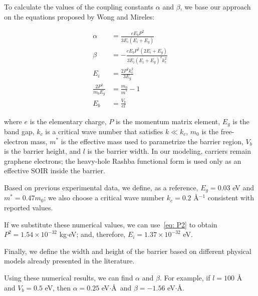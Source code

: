 To calculate the values of the coupling constants $\alpha$ and $\beta$, we base our approach on the equations proposed by Wong and Mireles\cite{WongUNAM2005}:

\begin{align}
    \alpha &= \frac{eE_b P^2}{3E_i\left( E_i + E_g \right)}\label{eq: alfa}\\
    \beta &= -\frac{eE_b P^2\left( 2E_i + E_g \right)}{3E_i\left( E_i + E_g \right)^2 k_c^2}\label{eq: beta}\\
    E_i &= \frac{2P^2 k_c^2}{3E_g} \label{eq: E_i}\\
    \frac{2P^2}{m_0 E_g} &= \frac{m_0}{m^*} - 1 \label{eq: P2}\\
    E_b &= \frac{V_b}{el} \label{eq: E_b}
\end{align}

\noindent where $e$ is the elementary charge, $P$ is the momentum matrix element, $E_g$ is the band gap, $k_c$ is a critical wave number that satisfies $k \ll k_c$, $m_0$ is the free-electron mass, $m^*$ is the effective mass used to parametrize the barrier region, $V_b$ is the barrier height, and $l$ is the barrier width.
In our modeling, carriers remain graphene electrons; the heavy-hole Rashba functional form is used only as an effective SOIR inside the barrier.

Based on previous experimental data\cite{HuntSci2013, FuhrerSci2013, PallaBullMaterSci2016}, we define, as a reference, $E_g = 0.03$ eV and $m^* = 0.47m_0$; we also choose a critical wave number $k_c = 0.2$ \AA$^{-1}$ consistent with reported values.

If we substitute these numerical values, we can use~\eqref{eq: P2} to obtain $P^2=1.54\times10^{-32}$ kg$\cdot$eV; and, therefore, $E_i = 1.37\times10^{-32}$ eV\@.

Finally, we define the width and height of the barrier based on different physical models already presented in the literature.

Using these numerical results, we can find $\alpha$ and $\beta$.
For example, if $l=100$ \AA\, and $V_b = 0.5$ eV, then $\alpha = 0.25$ eV$\cdot$\AA\, and $\beta = -1.56$ eV$\cdot$\AA.


